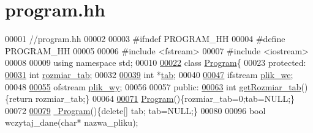 \hypertarget{program_8hh}{\section{program.\-hh}
\label{program_8hh}
}

\begin{DoxyCode}
00001 \textcolor{comment}{//program.hh}
00002 
00003 \textcolor{preprocessor}{#ifndef PROGRAM\_HH}
00004 \textcolor{preprocessor}{}\textcolor{preprocessor}{#define PROGRAM\_HH}
00005 \textcolor{preprocessor}{}
00006 \textcolor{preprocessor}{#include <fstream>}
00007 \textcolor{preprocessor}{#include <iostream>}
00008 
00009 \textcolor{keyword}{using namespace }std;
00010 
\hypertarget{program_8hh_source_l00022}{}\hyperlink{class_program}{00022} \textcolor{keyword}{class }\hyperlink{class_program}{Program}\{
00023 \textcolor{keyword}{protected}:
\hypertarget{program_8hh_source_l00031}{}\hyperlink{class_program_a3b5a10104019b9daa23ce4a5f5533820}{00031}   \textcolor{keywordtype}{int} \hyperlink{class_program_a3b5a10104019b9daa23ce4a5f5533820}{rozmiar\_tab};
00032 
\hypertarget{program_8hh_source_l00039}{}\hyperlink{class_program_ac72268c925315098b1632cc97d0f818a}{00039}   \textcolor{keywordtype}{int} *\hyperlink{class_program_ac72268c925315098b1632cc97d0f818a}{tab};
00040 
\hypertarget{program_8hh_source_l00047}{}\hyperlink{class_program_aac2f72538e24e533c327fe5546a59210}{00047}   ifstream \hyperlink{class_program_aac2f72538e24e533c327fe5546a59210}{plik\_we};
00048 
\hypertarget{program_8hh_source_l00055}{}\hyperlink{class_program_a59c1761a5ea875b3d5a4678928f3a1de}{00055}   ofstream \hyperlink{class_program_a59c1761a5ea875b3d5a4678928f3a1de}{plik\_wy};
00056 
00057 \textcolor{keyword}{public}:
\hypertarget{program_8hh_source_l00063}{}\hyperlink{class_program_a4fb9c2979a0dca1e14c75f4cc461bebd}{00063}   \textcolor{keywordtype}{int} \hyperlink{class_program_a4fb9c2979a0dca1e14c75f4cc461bebd}{getRozmiar\_tab}()\{\textcolor{keywordflow}{return} rozmiar\_tab;\}
00064 
\hypertarget{program_8hh_source_l00071}{}\hyperlink{class_program_aaefaa0df08f3484476fc4d61e97acbdc}{00071}   \hyperlink{class_program_aaefaa0df08f3484476fc4d61e97acbdc}{Program}()\{rozmiar\_tab=0;tab=NULL;\}
00072 
\hypertarget{program_8hh_source_l00079}{}\hyperlink{class_program_a986aef1c50e1d338a3315a47ba6df549}{00079}   \hyperlink{class_program_a986aef1c50e1d338a3315a47ba6df549}{~Program}()\{\textcolor{keyword}{delete}[] tab; tab=NULL;\}
00080 
00096   \textcolor{keywordtype}{bool} wczytaj\_dane(\textcolor{keywordtype}{char}* nazwa\_pliku);

\end{DoxyCode}
